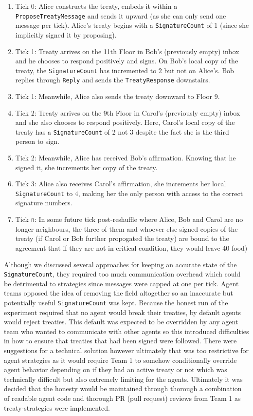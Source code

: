 \begin{enumerate}
    \item Tick 0: Alice constructs the treaty, embeds it within a \texttt{ProposeTreatyMessage} and sends it upward (as she can only send one message per tick). Alice's treaty begins with a \texttt{SignatureCount} of 1 (since she implicitly signed it by proposing).
    \item Tick 1: Treaty arrives on the 11th Floor in Bob's (previously empty) inbox and he chooses to respond positively and signs. On Bob's local copy of the treaty, the \texttt{SignatureCount} has incremented to 2 but not on Alice's. Bob replies through \texttt{Reply} and sends the  \texttt{TreatyResponse} downstairs.
    \item Tick 1: Meanwhile, Alice also sends the treaty downward to Floor 9.
    \item Tick 2: Treaty arrives on the 9th Floor in Carol's (previously empty) inbox and she also chooses to respond positively. \newline
    Here, Carol's local copy of the treaty has a \texttt{SignatureCount} of 2 not 3 despite the fact she is the third person to sign.
    \item Tick 2: Meanwhile, Alice has received Bob's affirmation. Knowing that he signed it, she increments her copy of the treaty.
    \item Tick 3: Alice also receives Carol's affirmation, she increments her local \texttt{SignatureCount} to 4, making her the only person with access to the correct signature numbers.
    \item Tick \texttt{n}: In some future tick post-reshuffle where Alice, Bob and Carol are no longer neighbours, the three of them and whoever else signed copies of the treaty (if Carol or Bob further propogated the treaty) are bound to the agreement that if they are not in critical condition, they would leave 40 food)
\end{enumerate}
Although we discussed several approaches for keeping an accurate state of the \texttt{SignatureCount}, they required too much communication overhead which could be detrimental to strategies since messages were capped at one per tick. Agent teams opposed the idea of removing the field altogether so an inaccurate but potentially useful \texttt{SignatureCount} was kept. \newline
Because the honest run of the experiment required that no agent would break their treaties, by default agents would reject treaties. This default was expected to be overridden by any agent team who wanted to communicate with other agents so this introduced difficulties in how to ensure that treaties that had been signed were followed. There were suggestions for a technical solution however ultimately that was too restrictive for agent strategies as it would require Team 1 to somehow conditionally override agent behavior depending on if they had an active treaty or not which was technically difficult but also extremely limiting for the agents. Ultimately it was decided that the honesty would be maintained through thorough a combination of readable agent code and thorough PR (pull request) reviews from Team 1 as treaty-strategies were implemented. \newline
